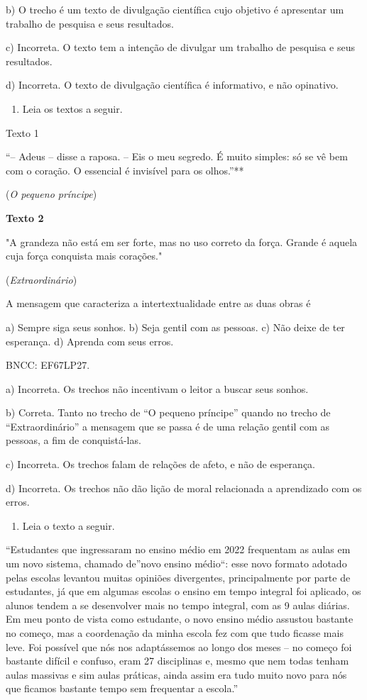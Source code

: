 {b) O trecho é um texto de divulgação científica cujo objetivo é
apresentar um trabalho de pesquisa e seus resultados.

c) Incorreta. O texto tem a intenção de divulgar um trabalho de pesquisa
e seus resultados.

d) Incorreta. O texto de divulgação científica é informativo, e não
opinativo.

\begin{enumerate}
\def\labelenumi{\arabic{enumi}.}
\setcounter{enumi}{8}
\tightlist
\item
  Leia os textos a seguir.
\end{enumerate}

Texto 1

``-- Adeus -- disse a raposa. -- Eis o meu segredo. É muito simples: só
se vê bem com o coração. O essencial é invisível para os olhos.''**

(\emph{O pequeno príncipe})

\textbf{Texto 2}

"A grandeza não está em ser forte, mas no uso correto da força. Grande é
aquela cuja força conquista mais corações."

(\emph{Extraordinário})

A mensagem que caracteriza a intertextualidade entre as duas obras é

a) Sempre siga seus sonhos. b) Seja gentil com as pessoas. c) Não deixe
de ter esperança. d) Aprenda com seus erros.

BNCC: EF67LP27.

a) Incorreta. Os trechos não incentivam o leitor a buscar seus sonhos.

b) Correta. Tanto no trecho de ``O pequeno príncipe'' quando no trecho
de ``Extraordinário'' a mensagem que se passa é de uma relação gentil
com as pessoas, a fim de conquistá-las.

c) Incorreta. Os trechos falam de relações de afeto, e não de esperança.

d) Incorreta. Os trechos não dão lição de moral relacionada a
aprendizado com os erros.

\begin{enumerate}
\def\labelenumi{\arabic{enumi}.}
\setcounter{enumi}{9}
\tightlist
\item
  Leia o texto a seguir.
\end{enumerate}

``Estudantes que ingressaram no ensino médio em 2022 frequentam as aulas
em um novo sistema, chamado de''novo ensino médio``: esse novo formato
adotado pelas escolas levantou muitas opiniões divergentes,
principalmente por parte de estudantes, já que em algumas escolas o
ensino em tempo integral foi aplicado, os alunos tendem a se desenvolver
mais no tempo integral, com as 9 aulas diárias. Em meu ponto de vista
como estudante, o novo ensino médio assustou bastante no começo, mas a
coordenação da minha escola fez com que tudo ficasse mais leve. Foi
possível que nós nos adaptássemos ao longo dos meses -- no começo foi
bastante difícil e confuso, eram 27 disciplinas e, mesmo que nem todas
tenham aulas massivas e sim aulas práticas, ainda assim era tudo muito
novo para nós que ficamos bastante tempo sem frequentar a escola.''

}
